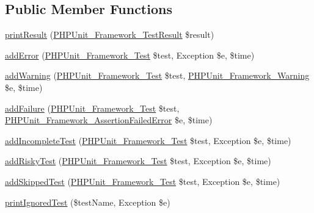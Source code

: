 \subsection*{Public Member Functions}
\begin{DoxyCompactItemize}
\item 
\mbox{\hyperlink{class_p_h_p_unit___util___log___team_city_ae4d4a8638af5b91aaa55d983037baf78}{print\+Result}} (\mbox{\hyperlink{class_p_h_p_unit___framework___test_result}{P\+H\+P\+Unit\+\_\+\+Framework\+\_\+\+Test\+Result}} \$result)
\item 
\mbox{\hyperlink{class_p_h_p_unit___util___log___team_city_a320d7bc7d2f9264ee7ba7aca6fd2df41}{add\+Error}} (\mbox{\hyperlink{interface_p_h_p_unit___framework___test}{P\+H\+P\+Unit\+\_\+\+Framework\+\_\+\+Test}} \$test, Exception \$e, \$time)
\item 
\mbox{\hyperlink{class_p_h_p_unit___util___log___team_city_a6c3d134992c5b03573561ef82e7f743d}{add\+Warning}} (\mbox{\hyperlink{interface_p_h_p_unit___framework___test}{P\+H\+P\+Unit\+\_\+\+Framework\+\_\+\+Test}} \$test, \mbox{\hyperlink{class_p_h_p_unit___framework___warning}{P\+H\+P\+Unit\+\_\+\+Framework\+\_\+\+Warning}} \$e, \$time)
\item 
\mbox{\hyperlink{class_p_h_p_unit___util___log___team_city_a668f17b68705c5c8686bac690a6f719d}{add\+Failure}} (\mbox{\hyperlink{interface_p_h_p_unit___framework___test}{P\+H\+P\+Unit\+\_\+\+Framework\+\_\+\+Test}} \$test, \mbox{\hyperlink{class_p_h_p_unit___framework___assertion_failed_error}{P\+H\+P\+Unit\+\_\+\+Framework\+\_\+\+Assertion\+Failed\+Error}} \$e, \$time)
\item 
\mbox{\hyperlink{class_p_h_p_unit___util___log___team_city_a81bfe09a62194fe5769ca1cc36ee428b}{add\+Incomplete\+Test}} (\mbox{\hyperlink{interface_p_h_p_unit___framework___test}{P\+H\+P\+Unit\+\_\+\+Framework\+\_\+\+Test}} \$test, Exception \$e, \$time)
\item 
\mbox{\hyperlink{class_p_h_p_unit___util___log___team_city_ad161e7d13b117cb0af3967cd2adc6bba}{add\+Risky\+Test}} (\mbox{\hyperlink{interface_p_h_p_unit___framework___test}{P\+H\+P\+Unit\+\_\+\+Framework\+\_\+\+Test}} \$test, Exception \$e, \$time)
\item 
\mbox{\hyperlink{class_p_h_p_unit___util___log___team_city_a1c0cb3bc58e5807530daf3a93783ed4e}{add\+Skipped\+Test}} (\mbox{\hyperlink{interface_p_h_p_unit___framework___test}{P\+H\+P\+Unit\+\_\+\+Framework\+\_\+\+Test}} \$test, Exception \$e, \$time)
\item 
\mbox{\hyperlink{class_p_h_p_unit___util___log___team_city_a277dbcf7a698fc6fb61ed84278db3ecd}{print\+Ignored\+Test}} (\$test\+Name, Exception \$e)

\end{DoxyCompactItemize}
